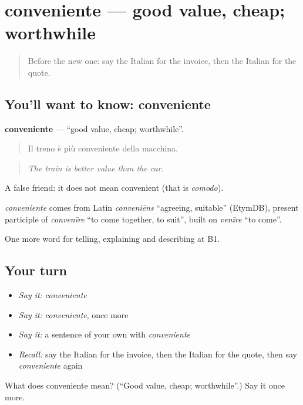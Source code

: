 \section[conveniente]{conveniente — good value, cheap; worthwhile}

\label{lesson:IT-C397-conveniente}



\begin{quote}
Before the new one: say the Italian for the invoice, then the Italian for the quote.
\end{quote}

\subsection*{You'll want to know: conveniente}
\textbf{conveniente} — \textquotedblleft{}good value, cheap; worthwhile\textquotedblright{}.

\begin{quote}
Il treno è più conveniente della macchina.
\end{quote}

\begin{quote}
\emph{The train is better value than the car.}
\end{quote}

A false friend: it does not mean convenient (that is \emph{comodo}).

\begin{cousinweb}
\emph{conveniente} comes from Latin \emph{conveniēns} \textquotedblleft{}agreeing, suitable\textquotedblright{} (EtymDB), present participle of \emph{convenīre} \textquotedblleft{}to come together, to suit\textquotedblright{}, built on \emph{venīre} \textquotedblleft{}to come\textquotedblright{}.
\end{cousinweb}

\begin{grammarlens}[title={What you've built}]
One more word for telling, explaining and describing at B1.
\end{grammarlens}

\subsection*{Your turn}
\begin{itemize}
\raggedright
  \item \emph{Say it:} \emph{conveniente}
  \item \emph{Say it:} \emph{conveniente}, once more
  \item \emph{Say it:} a sentence of your own with \emph{conveniente}
  \item \emph{Recall:} say the Italian for the invoice, then the Italian for the quote, then say \emph{conveniente} again
\end{itemize}

\begin{tcolorbox}[breakable,colback=teal!4,colframe=teal!35!black,title={Before you move on}]
What does conveniente mean? (\textquotedblleft{}Good value, cheap; worthwhile\textquotedblright{}.) Say it once more.
\end{tcolorbox}
